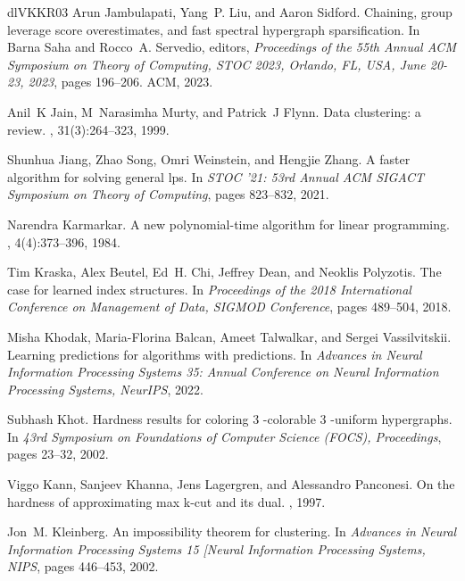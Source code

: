 \documentclass[10pt,a4paper]{amsart}
\begin{document}
\begin{thebibliography}{dlVKKR03}
Arun Jambulapati, Yang~P. Liu, and Aaron Sidford.
\newblock Chaining, group leverage score overestimates, and fast spectral hypergraph sparsification.
\newblock In Barna Saha and Rocco~A. Servedio, editors, {\em Proceedings of the 55th Annual {ACM} Symposium on Theory of Computing, {STOC} 2023, Orlando, FL, USA, June 20-23, 2023}, pages 196--206. {ACM}, 2023.

Anil~K Jain, M~Narasimha Murty, and Patrick~J Flynn.
\newblock Data clustering: a review.
, 31(3):264--323, 1999.

Shunhua Jiang, Zhao Song, Omri Weinstein, and Hengjie Zhang.
\newblock A faster algorithm for solving general lps.
\newblock In {\em {STOC} '21: 53rd Annual {ACM} {SIGACT} Symposium on Theory of Computing}, pages 823--832, 2021.

Narendra Karmarkar.
\newblock A new polynomial-time algorithm for linear programming.
, 4(4):373--396, 1984.

Tim Kraska, Alex Beutel, Ed~H. Chi, Jeffrey Dean, and Neoklis Polyzotis.
\newblock The case for learned index structures.
\newblock In {\em Proceedings of the 2018 International Conference on Management of Data, {SIGMOD} Conference}, pages 489--504, 2018.

Misha Khodak, Maria{-}Florina Balcan, Ameet Talwalkar, and Sergei Vassilvitskii.
\newblock Learning predictions for algorithms with predictions.
\newblock In {\em Advances in Neural Information Processing Systems 35: Annual Conference on Neural Information Processing Systems, NeurIPS}, 2022.

Subhash Khot.
\newblock Hardness results for coloring 3 -colorable 3 -uniform hypergraphs.
\newblock In {\em 43rd Symposium on Foundations of Computer Science {(FOCS}), Proceedings}, pages 23--32, 2002.

Viggo Kann, Sanjeev Khanna, Jens Lagergren, and Alessandro Panconesi.
\newblock On the hardness of approximating max k-cut and its dual.
, 1997.

Jon~M. Kleinberg.
\newblock An impossibility theorem for clustering.
\newblock In {\em Advances in Neural Information Processing Systems 15 [Neural Information Processing Systems, {NIPS}}, pages 446--453, 2002.


\end{thebibliography}
\end{document}

